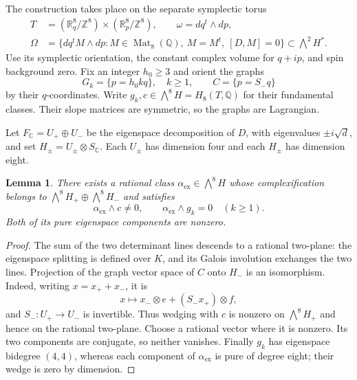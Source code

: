 \documentclass[11pt]{article}
\newtheorem{lemma}[theorem]{Lemma}
\theoremstyle{definition}
\theoremstyle{remark}
\numberwithin{equation}{section}
\begin{document}
The construction takes place on the separate symplectic torus
\begin{equation}
 \begin{split}
 T&=(\mathbb R^8_q/\mathbb Z^8)\times(\mathbb R^8_p/\mathbb Z^8),\qquad
       \omega=dq^t\wedge dp,\\
 \Omega&=\{dq^tM\wedge dp:M\in\operatorname{Mat}_8(\mathbb Q),\
                    M=M^t,\ [D,M]=0\}
       \subset\bigwedge^2H^*.
 \end{split}
 \label{hodge:omega-space}
\end{equation}
Use its symplectic orientation, the constant complex volume for $q+ip$,
and spin background zero.  Fix an integer $h_0\ge3$ and orient the graphs
\begin{equation}
 G_k=\{p=h_0kq\},\quad k\ge1,\qquad C=\{p=S_-q\}
 \label{hodge:graph-classes}
\end{equation}
by their $q$-coordinates.  Write $g_k,c\in\bigwedge^8H=H_8(T,\mathbb Q)$
for their fundamental classes.  Their slope matrices are symmetric, so
the graphs are Lagrangian.

Let $F_\mathbb C=U_+\oplus U_-$ be the eigenspace decomposition of $D$, with
eigenvalues $\pm i\sqrt d$, and set $H_\pm=U_\pm\otimes S_\mathbb C$.
Each $U_\pm$ has dimension four and each $H_\pm$ has dimension eight.

\begin{lemma}
\label{hodge:exceptional-homology}
There exists a rational class $\alpha_{\mathrm{ex}}\in\bigwedge^8H$
whose complexification belongs to
$\bigwedge^8H_+\oplus\bigwedge^8H_-$ and satisfies
\begin{equation}
 \alpha_{\mathrm{ex}}\wedge c\ne0,
 \qquad \alpha_{\mathrm{ex}}\wedge g_k=0\quad(k\ge1).
 \label{hodge:exceptional-pairings}
\end{equation}
Both of its pure eigenspace components are nonzero.
\end{lemma}

\begin{proof}
The sum of the two determinant lines descends to a rational two-plane:
the eigenspace splitting is defined over $K$, and its Galois involution
exchanges the two lines.  Projection of the graph vector space of $C$
onto $H_-$ is an isomorphism.  Indeed, writing $x=x_++x_-$, it is
\[
 x\longmapsto x_-\otimes e+(S_-x_+)\otimes f,
\]
and $S_-:U_+\to U_-$ is invertible.  Thus wedging with $c$ is nonzero
on $\bigwedge^8H_+$ and hence on the rational two-plane.  Choose a rational
vector where it is nonzero.  Its two components are conjugate, so neither
vanishes.  Finally $g_k$ has eigenspace bidegree $(4,4)$, whereas each
component of $\alpha_{\mathrm{ex}}$ is pure of degree eight; their wedge
is zero by dimension.
\end{proof}
\end{document}
